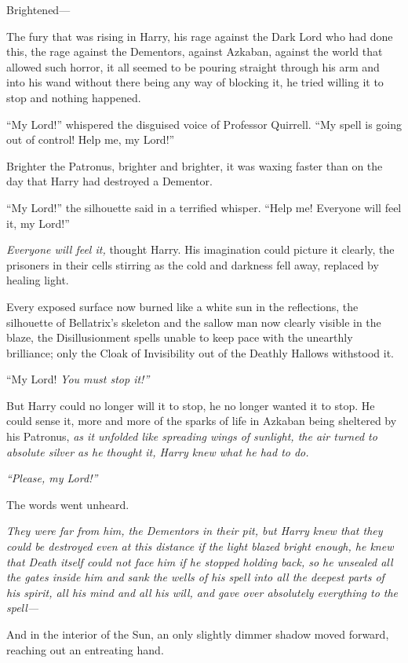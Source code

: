 Brightened---

The fury that was rising in Harry, his rage against the Dark Lord who
had done this, the rage against the Dementors, against Azkaban, against
the world that allowed such horror, it all seemed to be pouring straight
through his arm and into his wand without there being any way of
blocking it, he tried willing it to stop and nothing happened.

``My Lord!'' whispered the disguised voice of Professor Quirrell. ``My
spell is going out of control! Help me, my Lord!''

Brighter the Patronus, brighter and brighter, it was waxing faster than
on the day that Harry had destroyed a Dementor.

``My Lord!'' the silhouette said in a terrified whisper. ``Help me!
Everyone will feel it, my Lord!''

\emph{Everyone will feel it,} thought Harry. His imagination could
picture it clearly, the prisoners in their cells stirring as the cold
and darkness fell away, replaced by healing light.

Every exposed surface now burned like a white sun in the reflections,
the silhouette of Bellatrix's skeleton and the sallow man now clearly
visible in the blaze, the Disillusionment spells unable to keep pace
with the unearthly brilliance; only the Cloak of Invisibility out of the
Deathly Hallows withstood it.

``My Lord! \emph{You must stop it!''}

But Harry could no longer will it to stop, he no longer wanted it to
stop. He could sense it, more and more of the sparks of life in Azkaban
being sheltered by his Patronus, \emph{as it unfolded like spreading
wings of sunlight, the air turned to absolute silver as he thought it,
Harry knew what he had to do.}

\emph{``Please, my Lord!''}

The words went unheard.

\emph{They were far from him, the Dementors in their pit, but Harry knew
that they could be destroyed even at this distance if the light blazed
bright enough, he knew that Death itself could not face him if he
stopped holding back, so he unsealed all the gates inside him and sank
the wells of his spell into all the deepest parts of his spirit, all his
mind and all his will, and gave over absolutely everything to the
spell---}

And in the interior of the Sun, an only slightly dimmer shadow moved
forward, reaching out an entreating hand.

